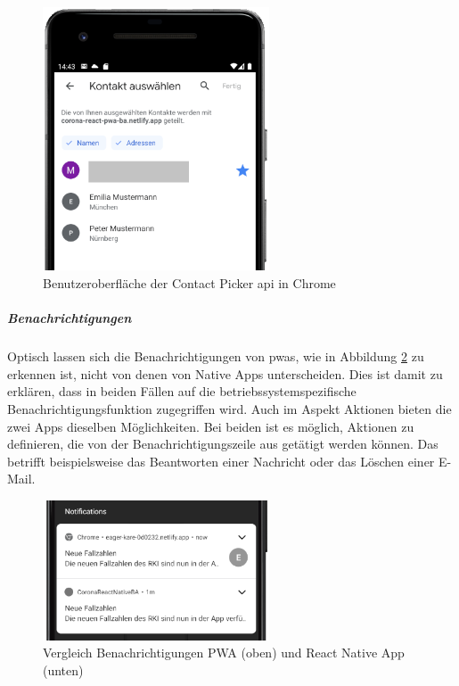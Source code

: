 \begin{figure}[h]
 \centering
 \includegraphics[width=0.6\textwidth]{figures/contact_picker_ui.png}
 \caption{Benutzeroberfläche der Contact Picker \ac{api} in Chrome}
 \label{fig:contact_picker_ui}
\end{figure}

\subparagraph{Benachrichtigungen\\}
Optisch lassen sich die Benachrichtigungen von \acp{pwa}, wie in Abbildung \ref{fig:pushnotifications_comparison} zu erkennen ist, nicht von denen von Native Apps unterscheiden.
Dies ist damit zu erklären, dass in beiden Fällen auf die betriebssystemspezifische Benachrichtigungsfunktion zugegriffen wird.
Auch im Aspekt Aktionen bieten die zwei Apps dieselben Möglichkeiten.
Bei beiden ist es möglich, Aktionen zu definieren, die von der Benachrichtigungszeile aus getätigt werden können.
Das betrifft beispielsweise das Beantworten einer Nachricht oder das Löschen einer E-Mail.

\begin{figure}[h]
 \centering
 \includegraphics[width=0.6\textwidth]{figures/Push_notifications.png}
 \caption{Vergleich Benachrichtigungen PWA (oben) und React Native App (unten)}
 \label{fig:pushnotifications_comparison}
\end{figure}

